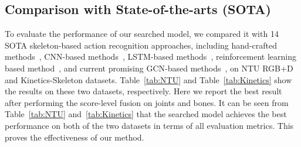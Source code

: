 \documentclass[letterpaper]{article} \usepackage{aaai19}  \usepackage{times}  \usepackage{helvet} \usepackage{courier}  \usepackage[hyphens]{url}  \usepackage{graphicx} \urlstyle{rm} \def\UrlFont{\rm}  \usepackage{graphicx}  \frenchspacing  \setlength{\pdfpagewidth}{8.5in}  \setlength{\pdfpageheight}{11in}
\begin{document}
\subsection{Comparison with State-of-the-arts (SOTA)} 

To evaluate the performance of our searched model, we compared it with 14 SOTA skeleton-based action recognition approaches, including hand-crafted methods~\cite{hu2015jointly}, CNN-based methods~\cite{kim2017interpretable,liu2017enhanced}, LSTM-based methods~\cite{shahroudy2016ntu,song2017end,zhang2017view,si2018skeleton}, reinforcement learning based method~\cite{tang2018deep}, and current promising GCN-based methods~\cite{li2018spatio,yan2018stgan,li2019spatio,gao2019optimized,li2019actional,shi2019two}, on NTU RGB+D and Kinetics-Skeleton datasets. Table~\ref{tab:NTU} and Table~\ref{tab:Kinetics} show the results on these two datasets, respectively. Here we report the best result after performing the score-level fusion on joints and bones. It can be seen from Table~\ref{tab:NTU} and~\ref{tab:Kinetics} that the searched model achieves the best performance on both of the two datasets in terms of all evaluation metrics. This proves the effectiveness of our method.
\end{document}
